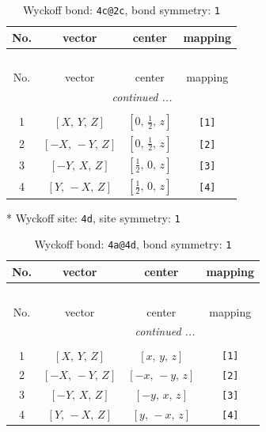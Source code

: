 \documentclass[fleqn,8pt]{jsarticle}
\begin{document}
\begin{longtable}{cccc}
\caption{Wyckoff bond: {\tt 4c@2c}, bond symmetry: {\tt 1}}
 \\
 \hline \hline
No. & vector & center & mapping \\ \hline \endfirsthead

\multicolumn{3}{l}{\tablename\ \thetable{}} \\
 \hline \hline
No. & vector & center & mapping \\ \hline \endhead

 \hline \hline
\multicolumn{3}{r}{\footnotesize\it continued ...} \\ \endfoot

 \hline \hline
\multicolumn{3}{r}{} \\ \endlastfoot

1 & $\left[ X,\, Y,\, Z \right]$ & $\left[ 0,\, \frac{1}{2},\, z \right]$ & {\tt [1]} \\ \hline
2 & $\left[ - X,\, - Y,\, Z \right]$ & $\left[ 0,\, \frac{1}{2},\, z \right]$ & {\tt [2]} \\ \hline
3 & $\left[ - Y,\, X,\, Z \right]$ & $\left[ \frac{1}{2},\, 0,\, z \right]$ & {\tt [3]} \\ \hline
4 & $\left[ Y,\, - X,\, Z \right]$ & $\left[ \frac{1}{2},\, 0,\, z \right]$ & {\tt [4]} \\
\end{longtable}
* Wyckoff site: {\tt 4d}, site symmetry: {\tt 1}
\renewcommand{\arraystretch}{1.2}
\begin{longtable}{cccc}
\caption{Wyckoff bond: {\tt 4a@4d}, bond symmetry: {\tt 1}}
 \\
 \hline \hline
No. & vector & center & mapping \\ \hline \endfirsthead

\multicolumn{3}{l}{\tablename\ \thetable{}} \\
 \hline \hline
No. & vector & center & mapping \\ \hline \endhead

 \hline \hline
\multicolumn{3}{r}{\footnotesize\it continued ...} \\ \endfoot

 \hline \hline
\multicolumn{3}{r}{} \\ \endlastfoot

1 & $\left[ X,\, Y,\, Z \right]$ & $\left[ x,\, y,\, z \right]$ & {\tt [1]} \\ \hline
2 & $\left[ - X,\, - Y,\, Z \right]$ & $\left[ - x,\, - y,\, z \right]$ & {\tt [2]} \\ \hline
3 & $\left[ - Y,\, X,\, Z \right]$ & $\left[ - y,\, x,\, z \right]$ & {\tt [3]} \\ \hline
4 & $\left[ Y,\, - X,\, Z \right]$ & $\left[ y,\, - x,\, z \right]$ & {\tt [4]} \\
\end{longtable}
\end{document}
